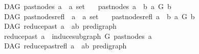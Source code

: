 \begin{isabellebody}
\isanewline
{}\isamarkupfalse%
\ {\isacharparenleft}{\kern0pt}\ DAG{\isacharparenright}{\kern0pt}\ past{\isacharunderscore}{\kern0pt}nodes{\isacharcolon}{\kern0pt}{\isacharcolon}{\kern0pt}\ {\isachardoublequoteopen}{\isacharprime}{\kern0pt}a\ {\isasymRightarrow}\ {\isacharprime}{\kern0pt}a\ set{\isachardoublequoteclose}\isanewline
\ \ \ {\isachardoublequoteopen}past{\isacharunderscore}{\kern0pt}nodes\ a\ {\isacharequal}{\kern0pt}\ {\isacharbraceleft}{\kern0pt}b{\isachardot}{\kern0pt}\ a\ {\isasymrightarrow}\isactrlsup {\isacharplus}{\kern0pt}\isactrlbsub G\isactrlesub \ b{\isacharbraceright}{\kern0pt}{\isachardoublequoteclose}\isanewline
\isanewline
{}\isamarkupfalse%
\ {\isacharparenleft}{\kern0pt}\ DAG{\isacharparenright}{\kern0pt}\ past{\isacharunderscore}{\kern0pt}nodes{\isacharunderscore}{\kern0pt}refl\ {\isacharcolon}{\kern0pt}{\isacharcolon}{\kern0pt}\ {\isachardoublequoteopen}{\isacharprime}{\kern0pt}a\ {\isasymRightarrow}\ {\isacharprime}{\kern0pt}a\ set{\isachardoublequoteclose}\isanewline
\ \ \ {\isachardoublequoteopen}past{\isacharunderscore}{\kern0pt}nodes{\isacharunderscore}{\kern0pt}refl\ a\ {\isacharequal}{\kern0pt}\ {\isacharbraceleft}{\kern0pt}b{\isachardot}{\kern0pt}\ a\ {\isasymrightarrow}\isactrlsup {\isacharasterisk}{\kern0pt}\isactrlbsub G\isactrlesub \ b{\isacharbraceright}{\kern0pt}{\isachardoublequoteclose}\isanewline
\isanewline
{}\isamarkupfalse%
\ {\isacharparenleft}{\kern0pt}\ DAG{\isacharparenright}{\kern0pt}\ reduce{\isacharunderscore}{\kern0pt}past{\isacharcolon}{\kern0pt}{\isacharcolon}{\kern0pt}\ {\isachardoublequoteopen}{\isacharprime}{\kern0pt}a\ {\isasymRightarrow}\ {\isacharparenleft}{\kern0pt}{\isacharprime}{\kern0pt}a{\isacharcomma}{\kern0pt}{\isacharprime}{\kern0pt}b{\isacharparenright}{\kern0pt}\ pre{\isacharunderscore}{\kern0pt}digraph{\isachardoublequoteclose}\isanewline
\ \ \ \isanewline
\ \ {\isachardoublequoteopen}reduce{\isacharunderscore}{\kern0pt}past\ a\ {\isacharequal}{\kern0pt}\ induce{\isacharunderscore}{\kern0pt}subgraph\ G\ {\isacharparenleft}{\kern0pt}past{\isacharunderscore}{\kern0pt}nodes\ a{\isacharparenright}{\kern0pt}{\isachardoublequoteclose}\isanewline
\isanewline
{}\isamarkupfalse%
\ {\isacharparenleft}{\kern0pt}\ DAG{\isacharparenright}{\kern0pt}\ reduce{\isacharunderscore}{\kern0pt}past{\isacharunderscore}{\kern0pt}refl{\isacharcolon}{\kern0pt}{\isacharcolon}{\kern0pt}\ {\isachardoublequoteopen}{\isacharprime}{\kern0pt}a\ {\isasymRightarrow}\ {\isacharparenleft}{\kern0pt}{\isacharprime}{\kern0pt}a{\isacharcomma}{\kern0pt}{\isacharprime}{\kern0pt}b{\isacharparenright}{\kern0pt}\ pre{\isacharunderscore}{\kern0pt}digraph{\isachardoublequoteclose}\isanewline

\end{isabellebody}
